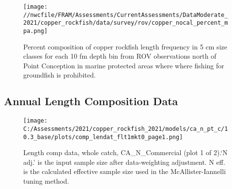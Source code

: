 \documentclass[11pt,
  english,
  a4paper,
]{article}
\begin{document}
\tagmcend\tagstructend

\clearpage


\begin{figure}
\centering
\texttt{[image: //nwcfile/FRAM/Assessments/CurrentAssessments/DataModerate\_2021/copper\_rockfish/data/survey/rov/copper\_nocal\_percent\_mpa.png]}
\caption{Percent composition of copper rockfish length frequency in 5 cm size classes for each 10 fm depth bin from ROV observations north of Point Conception in marine protected areas where where fishing for groundfish is prohibited.\label{fig:rov-percent-mpa}}
\end{figure}

\tagmcend\tagstructend

\newpage


\hypertarget{annual-length-composition-data}{%
\subsection{Annual Length Composition Data}\label{annual-length-composition-data}}

\leavevmode\tagmcend\tagstructend


\begin{figure}
\centering
\texttt{[image: C:/Assessments/2021/copper\_rockfish\_2021/models/ca\_n\_pt\_c/10.3\_base/plots/comp\_lendat\_flt1mkt0\_page1.png]}
\caption{Length comp data, whole catch, CA\_N\_Commercial (plot 1 of 2).`N adj.' is the input sample size after data-weighting adjustment. N eff. is the calculated effective sample size used in the McAllister-Iannelli tuning method.\label{fig:comp_lendat_flt1mkt0_page1}}
\end{figure}

\tagmcend\tagstructend
\end{document}
